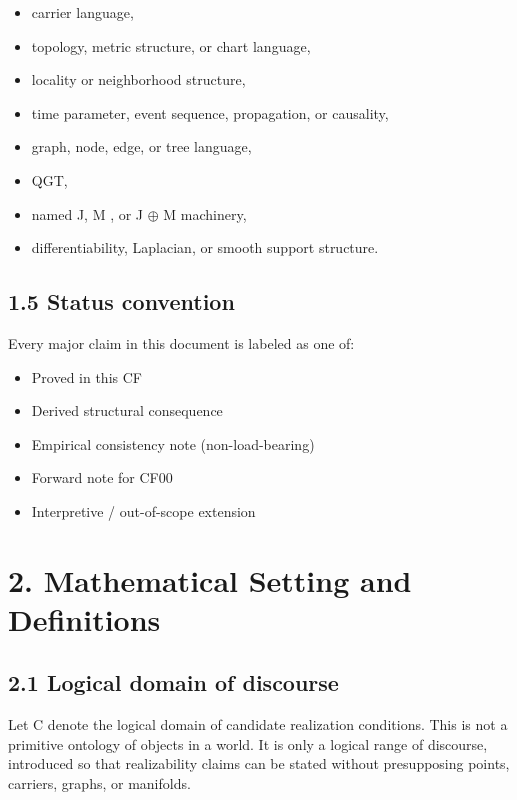 \documentclass[11pt]{article}
\begin{document}
\begin{itemize}
\item
  carrier language,
\item
  topology, metric structure, or chart language,
\item
  locality or neighborhood structure,
\item
  time parameter, event sequence, propagation, or causality,
\item
  graph, node, edge, or tree language,
\item
  QGT,
\item
  named J, M , or J $\oplus$ M machinery,
\item
  differentiability, Laplacian, or smooth support structure.
\end{itemize}

\subsection{1.5 Status convention}\label{status-convention}

Every major claim in this document is labeled as one of:

\begin{itemize}
\item
  Proved in this CF
\item
  Derived structural consequence
\item
  Empirical consistency note (non-load-bearing)
\item
  Forward note for CF00
\item
  Interpretive / out-of-scope extension
\end{itemize}

\section{2. Mathematical Setting and Definitions}\label{mathematical-setting-and-definitions}

\subsection{2.1 Logical domain of discourse}\label{logical-domain-of-discourse}

Let C denote the logical domain of candidate realization conditions. This is not a primitive ontology of objects in a world. It is only a logical range of discourse, introduced so that realizability claims can be stated without presupposing points, carriers, graphs, or manifolds.
\end{document}
